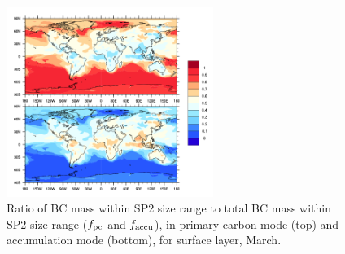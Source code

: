\documentclass[11pt]{article}
\begin{document}
	
	
	\begin{figure}[!h] 
		\begin{center}
			\includegraphics[width = 0.6\textwidth]{Rplot04}
			\caption[]{\label{fig_P4} Ratio of BC mass within SP2 size range to total BC mass within SP2 size range ($f_{\rm pc}$ and $f_{\rm accu}$), in primary carbon mode (top) and accumulation mode (bottom), for surface layer, March.}
		\end{center}
	\end{figure}
	
	
	
	
	
	\clearpage
	
	
	
	
	
	
	
	
	
	
	
	
\end{document}
